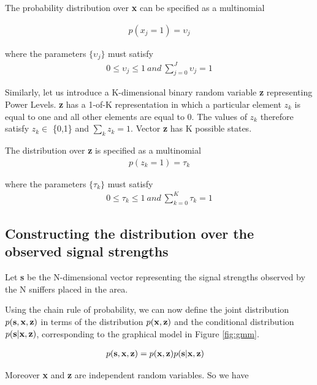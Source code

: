 \documentclass{Localization-PaperWriteupDraft}
\begin{document}
The probability distribution over {\bf x} can be specified as a multinomial 

\begin{align}
 p(x_{j} = 1) = \upsilon_{j}
\end{align}

where the parameters $\{\upsilon_{j}\}$ must satisfy
\begin{align}
0 \le \upsilon_{j} \le 1 \ and \ \sum_{j=0}^{J} \upsilon_{j} = 1
\end{align}

Similarly, let us introduce a K-dimensional binary random variable {\bf z} representing Power Levels. {\bf z} has a 1-of-K representation in which a particular element $z_{k}$ is equal to one and all other elements are equal to 0. The values of $z_{k}$ therefore satisfy $z_{k} \in$ \{0,1\} and $\sum_{k} z_{k} = 1$. Vector {\bf z} has K possible states.

The distribution over {\bf z} is specified as a multinomial 
\begin{align}
p(z_{k} = 1) = \tau_{k}
\end{align}

where the parameters $\{\tau_{k}\}$ must satisfy
\begin{align}
0 \le \tau_{k} \le 1 \ and \  \sum_{k=0}^{K} \tau_{k} = 1
\end{align}

\subsection{Constructing the distribution over the observed signal strengths}
\label{subsec:constructingthedistributionovertheobservedsignalstrengths}

Let {\bf s} be the N-dimensional vector representing the signal strengths observed by the N sniffers placed in the area. 

Using the chain rule of probability, we can now define the joint distribution $p( {\bf s}, {\bf x}, {\bf z})$ in terms of the distribution $p( {\bf x}, {\bf z})$ and the conditional distribution $p( {\bf s} | {\bf x}, {\bf z})$, corresponding to the graphical model in Figure \ref{fig:gmm}.

\begin{align}
p( {\bf s}, {\bf x}, {\bf z}) &= p( {\bf x}, {\bf z}) p( {\bf s} | {\bf x}, {\bf z}) 
\end{align}

Moreover {\bf x} and {\bf z} are independent random variables. So we have
\end{document}
